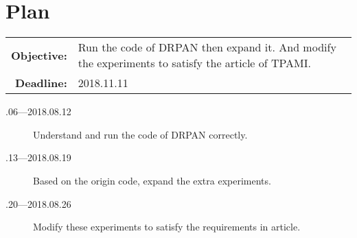 \documentclass[a4paper]{article}
\begin{document}
\section{Plan}

\begin{tabular}{rl}
	\textbf{Objective:} & Run the code of DRPAN then expand it. And modify the experiments to satisfy the article of TPAMI. \\
    \textbf{Deadline:} & 2018.11.11 
\end{tabular}

\begin{description}
    \item[.06---2018.08.12] Understand and run the code of DRPAN correctly.
    \item[.13---2018.08.19] Based on the origin code, expand the extra experiments.
    \item[.20---2018.08.26] Modify these experiments to satisfy the requirements in article.
\end{description}



\end{document}
